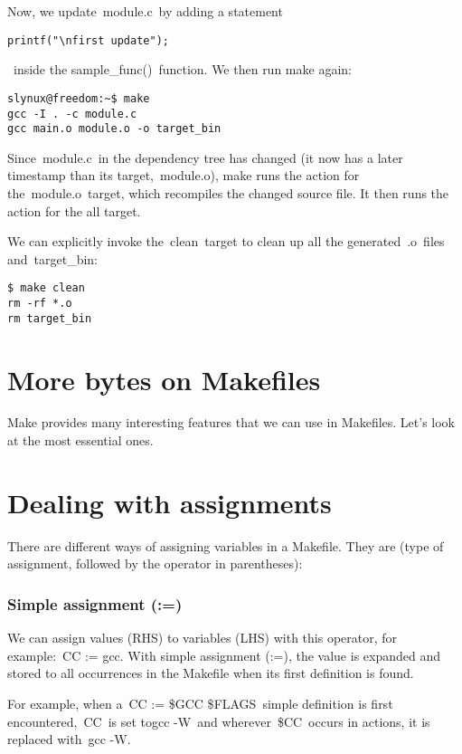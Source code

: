 \documentclass[output=paper, 
colorlinks,
citecolor=brown,
newtxmath
]{langscibook}
\begin{document}
Now, we update module.c by adding a statement \begin{verbatim}printf("\nfirst update");\end{verbatim} inside the sample\_func() function. We then run make again:

\begin{verbatim}
slynux@freedom:~$ make
gcc -I . -c module.c
gcc main.o module.o -o target_bin
\end{verbatim}

Since module.c in the dependency tree has changed (it now has a later timestamp than its target, module.o), make runs the action for the module.o target, which recompiles the changed source file. It then runs the action for the all target.

We can explicitly invoke the clean target to clean up all the generated .o files and target\_bin:

\begin{verbatim}
$ make clean
rm -rf *.o
rm target_bin
\end{verbatim}

\section {More bytes on Makefiles}

Make provides many interesting features that we can use in Makefiles. Let’s look at the most essential ones.

\section {Dealing with assignments}

There are different ways of assigning variables in a Makefile. They are (type of assignment, followed by the operator in parentheses):

\subsubsection {Simple assignment (:=)}

We can assign values (RHS) to variables (LHS) with this operator, for example: CC := gcc. With simple assignment (:=), the value is expanded and stored to all occurrences in the Makefile when its first definition is found.

For example, when a CC := \${GCC} \${FLAGS} simple definition is first encountered, CC is set togcc -W and wherever \${CC} occurs in actions, it is replaced with gcc -W.
\end{document}
